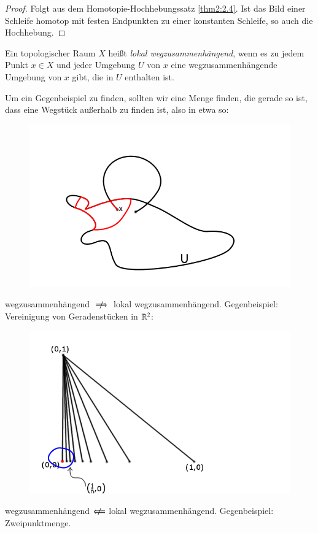 \documentclass[a4paper,10pt]{scrartcl}
\begin{document}
\begin{proof}
 Folgt aus dem Homotopie-Hochhebungssatz \ref{thm2:2.4}. Ist das Bild einer Schleife homotop mit festen Endpunkten zu einer konstanten Schleife, so auch die Hochhebung.
\end{proof}
\begin{df}
 Ein topologischer Raum $X$ heißt \emph{lokal wegzusammenhängend}, wenn es zu jedem Punkt $x\in X$ und jeder Umgebung $U$ von $x$ eine wegzusammenhängende Umgebung von $x$ gibt, die in $U$ enthalten ist. 
\end{df}
\begin{note*}
Um ein Gegenbeispiel zu finden, sollten wir eine Menge finden, die gerade so ist, dass eine Wegstück außerhalb zu finden ist, also in etwa so:
\begin{figure}[H]
\centering
 \includegraphics[scale=0.3]{fig81.png}
 \caption{}
\end{figure}
 wegzusammenhängend $\centernot \implies$  lokal wegzusammenhängend.  Gegenbeispiel: Vereinigung von Geradenstücken in $\mathbb{R}^2$:\\
\begin{figure}[H]
\centering
 \includegraphics[scale=0.3]{fig82.png}
 \caption{}
\end{figure}

 wegzusammenhängend $\nimplies$ lokal wegzusammenhängend. Gegenbeispiel: Zweipunktmenge.
\end{note*}
\end{document}
